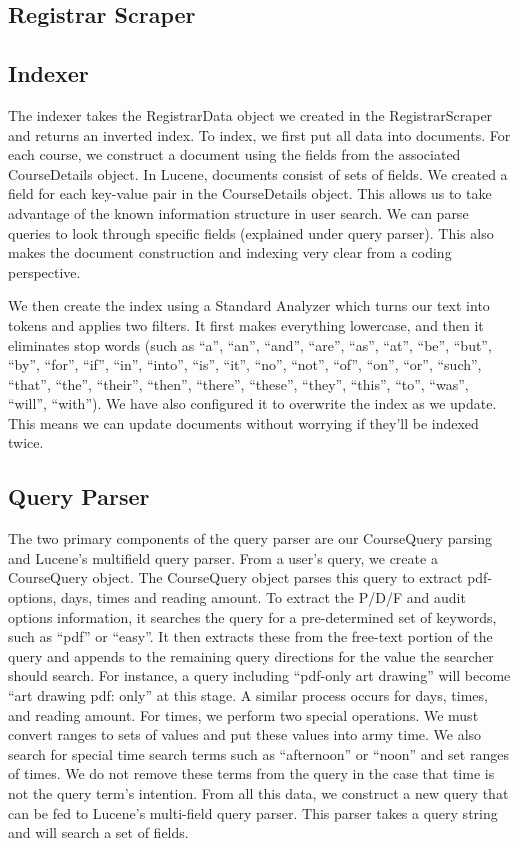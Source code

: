 \documentclass[12pt,letterpaper]{article}
\begin{document}
	\subsection{Registrar Scraper}
	\subsection{Indexer}
	
	The indexer takes the RegistrarData object we created in the RegistrarScraper and returns an inverted index. To index, we first put all data into documents. For each course, we construct a document using the fields from the associated CourseDetails object. In Lucene, documents consist of sets of fields. We created a field for each key-value pair in the CourseDetails object. This allows us to take advantage of the known information structure in user search. We can parse queries to look through specific fields (explained under query parser). This also makes the document construction and indexing very clear from a coding perspective. 
	
	We then create the index using a Standard Analyzer which turns our text into tokens and applies two filters. It first makes everything lowercase, and then it eliminates stop words (such as ``a'', ``an'',  ``and'', ``are'', ``as'', ``at'', ``be'', ``but'', ``by'', ``for'', ``if'', ``in'', ``into'', ``is'', ``it'', ``no'', ``not'', ``of'', ``on'', ``or'', ``such'', ``that'', ``the'', ``their'', ``then'', ``there'', ``these'', ``they'', ``this'', ``to'', ``was'', ``will'', ``with''). We have also configured it to overwrite the index as we update. This means we can update documents without worrying if they'll be indexed twice. 
	
	\subsection{Query Parser}
	
	The two primary components of the query parser are our CourseQuery parsing and Lucene's multifield query parser. From a user's query, we create a CourseQuery object. The CourseQuery object parses this query to extract pdf-options, days, times and reading amount. To extract the P/D/F and audit options information, it searches the query for a pre-determined set of keywords, such as ``pdf'' or ``easy''. It then extracts these from the free-text portion of the query and appends to the remaining query directions for the value the searcher should search. For instance, a query including ``pdf-only art drawing'' will become ``art drawing pdf: only'' at this stage. A similar process occurs for days, times, and reading amount. For times, we perform two special operations. We must convert ranges to sets of values and put these values into army time. We also search for special time search terms such as ``afternoon'' or ``noon'' and set ranges of times. We do not remove these terms from the query in the case that time is not the query term's intention. 
	From all this data, we construct a new query that can be fed to Lucene's multi-field query parser. This parser takes a query string and will search a set of fields.
	
\end{document}
